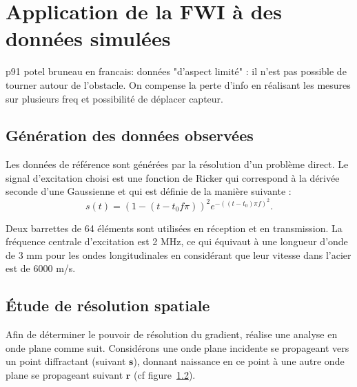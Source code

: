 \chapter{Application de la FWI à des données simulées \label{applications}}


p91 potel bruneau en francais: données "d'aspect limité" : il n'est pas possible de tourner autour de l'obstacle. On compense la perte d'info en réalisant les mesures sur plusieurs freq et possibilité de déplacer capteur.

\section{Génération des données observées}

Les données de référence sont générées par la résolution d'un problème direct.
Le signal d'excitation choisi est une fonction de Ricker qui correspond à la dérivée seconde d'une Gaussienne et qui est définie de la manière suivante : 
\begin{equation}
	s(t)=(1-(t-t_{0}f\pi))^2e^{-((t-t_{0})\pi f)^2}\text{.}
\end{equation}

Deux barrettes de 64 éléments sont utilisées en réception et en transmission. La fréquence centrale d'excitation est 2 MHz, ce qui équivaut à une longueur d'onde de 3 mm pour les ondes longitudinales en considérant que leur vitesse dans l'acier est de 6000 m/s.





\section{Étude de résolution spatiale \label{app:section_reso}}

Afin de déterminer le pouvoir de résolution du gradient, \cite{sirgue} réalise une analyse en onde plane comme suit. Considérons une onde plane incidente se propageant vers un point diffractant (suivant $\bm{s}$), donnant naissance en ce point à une autre onde plane se propageant suivant $\bm{r}$ (cf figure~\ref{}).


